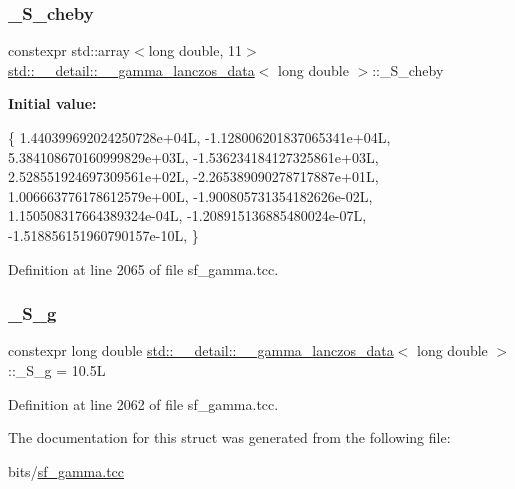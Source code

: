 \subsubsection{\texorpdfstring{\+\_\+\+S\+\_\+cheby}{\_S\_cheby}}
{\footnotesize\ttfamily constexpr std\+::array$<$long double, 11$>$ \hyperlink{structstd_1_1____detail_1_1____gamma__lanczos__data}{std\+::\+\_\+\+\_\+detail\+::\+\_\+\+\_\+gamma\+\_\+lanczos\+\_\+data}$<$ long double $>$\+::\+\_\+\+S\+\_\+cheby\hspace{0.3cm}{\ttfamily [static]}}

{\bfseries Initial value\+:}
\begin{DoxyCode}
\{
     1.440399692024250728e+04L,
    -1.128006201837065341e+04L,
     5.384108670160999829e+03L,
    -1.536234184127325861e+03L,
     2.528551924697309561e+02L,
    -2.265389090278717887e+01L,
     1.006663776178612579e+00L,
    -1.900805731354182626e-02L,
     1.150508317664389324e-04L,
    -1.208915136885480024e-07L,
    -1.518856151960790157e-10L,
      \}
\end{DoxyCode}


Definition at line 2065 of file sf\+\_\+gamma.\+tcc.

\mbox{\label{structstd_1_1____detail_1_1____gamma__lanczos__data_3_01long_01double_01_4_af86428283206e8b9bd3dc5709855c901}} 
\subsubsection{\texorpdfstring{\+\_\+\+S\+\_\+g}{\_S\_g}}
{\footnotesize\ttfamily constexpr long double \hyperlink{structstd_1_1____detail_1_1____gamma__lanczos__data}{std\+::\+\_\+\+\_\+detail\+::\+\_\+\+\_\+gamma\+\_\+lanczos\+\_\+data}$<$ long double $>$\+::\+\_\+\+S\+\_\+g = 10.\+5L\hspace{0.3cm}{\ttfamily [static]}}



Definition at line 2062 of file sf\+\_\+gamma.\+tcc.



The documentation for this struct was generated from the following file\+:\begin{DoxyCompactItemize}
\item 
bits/\hyperlink{sf__gamma_8tcc}{sf\+\_\+gamma.\+tcc}\end{DoxyCompactItemize}
